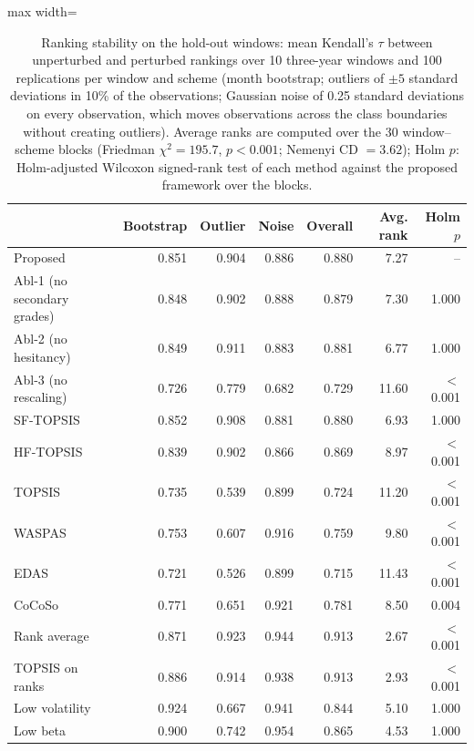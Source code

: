 \begin{table}[!htbp]
\centering
\footnotesize
\caption{Ranking stability on the hold-out windows: mean Kendall's $\tau$ between unperturbed and perturbed rankings over 10 three-year windows and 100 replications per window and scheme (month bootstrap; outliers of $\pm 5$ standard deviations in 10\% of the observations; Gaussian noise of 0.25 standard deviations on every observation, which moves observations across the class boundaries without creating outliers). Average ranks are computed over the 30 window--scheme blocks (Friedman $\chi^2=195.7$, $p<0.001$; Nemenyi CD $=3.62$); Holm $p$: Holm-adjusted Wilcoxon signed-rank test of each method against the proposed framework over the blocks.}\label{tab:robust}
\begin{adjustbox}{max width=\textwidth}
\begin{tabular}{lrrrrrr}
\toprule
 & Bootstrap & Outlier & Noise & Overall & Avg. rank & Holm $p$ \\
\midrule
Proposed & 0.851 & 0.904 & 0.886 & 0.880 & 7.27 & -- \\
Abl-1 (no secondary grades) & 0.848 & 0.902 & 0.888 & 0.879 & 7.30 & 1.000 \\
Abl-2 (no hesitancy) & 0.849 & 0.911 & 0.883 & 0.881 & 6.77 & 1.000 \\
Abl-3 (no rescaling) & 0.726 & 0.779 & 0.682 & 0.729 & 11.60 & $<$0.001 \\
SF-TOPSIS & 0.852 & 0.908 & 0.881 & 0.880 & 6.93 & 1.000 \\
HF-TOPSIS & 0.839 & 0.902 & 0.866 & 0.869 & 8.97 & $<$0.001 \\
TOPSIS & 0.735 & 0.539 & 0.899 & 0.724 & 11.20 & $<$0.001 \\
WASPAS & 0.753 & 0.607 & 0.916 & 0.759 & 9.80 & $<$0.001 \\
EDAS & 0.721 & 0.526 & 0.899 & 0.715 & 11.43 & $<$0.001 \\
CoCoSo & 0.771 & 0.651 & 0.921 & 0.781 & 8.50 & 0.004 \\
Rank average & 0.871 & 0.923 & 0.944 & 0.913 & 2.67 & $<$0.001 \\
TOPSIS on ranks & 0.886 & 0.914 & 0.938 & 0.913 & 2.93 & $<$0.001 \\
Low volatility & 0.924 & 0.667 & 0.941 & 0.844 & 5.10 & 1.000 \\
Low beta & 0.900 & 0.742 & 0.954 & 0.865 & 4.53 & 1.000 \\
\bottomrule
\end{tabular}
\end{adjustbox}
\end{table}
